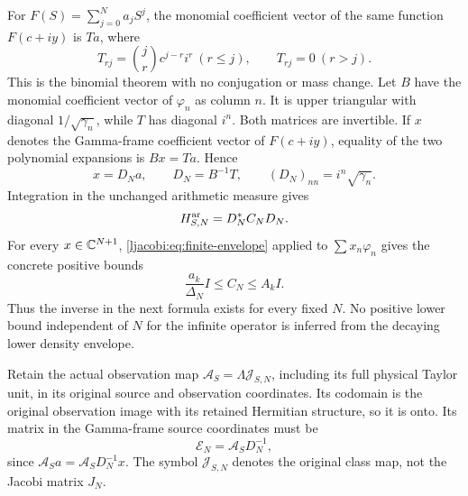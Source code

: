 For $F(S)=\sum_{j=0}^N a_jS^j$, the monomial coefficient vector
of the same function $F(c+iy)$ is $Ta$, where
\[
 T_{rj}=\binom jr c^{j-r}i^r\ (r\leq j),\qquad T_{rj}=0\ (r>j).
\]
This is the binomial theorem with no conjugation or mass change.
Let $B$ have the monomial coefficient vector of $\varphi_n$ as
column $n$. It is upper triangular with diagonal
$1/\sqrt{\gamma_n}$, while $T$ has diagonal $i^n$.
Both matrices are invertible. If $x$ denotes the Gamma-frame
coefficient vector of $F(c+iy)$, equality of the two polynomial
expansions is $Bx=Ta$. Hence
\begin{equation}\label{ljacobi:eq:source}
 x=D_Na,\qquad D_N=B^{-1}T,\qquad
 (D_N)_{nn}=i^n\sqrt{\gamma_n}.
\end{equation}
Integration in the unchanged arithmetic measure gives
\begin{equation}\label{ljacobi:eq:gram}
 H_{S,N}^{\rm ar}=D_N^*C_ND_N.
\end{equation}
For every $x\in\mathbb C^{N+1}$, \eqref{ljacobi:eq:finite-envelope} applied to
$\sum x_n\varphi_n$ gives the concrete positive bounds
\begin{equation}\label{ljacobi:eq:CN-bounds}
 \frac{a_k}{\Delta_N}I\leq C_N\leq A_kI.
\end{equation}
Thus the inverse in the next formula exists for every fixed $N$.
No positive lower bound independent of $N$ for the infinite
operator is inferred from the decaying lower density envelope.

Retain the actual observation map
$\mathcal A_S=\Lambda\mathcal J_{S,N}$, including its full physical
Taylor unit, in its original source and observation coordinates.
Its codomain is the original observation image with its retained
Hermitian structure, so it is onto. Its matrix in the Gamma-frame
source coordinates must be
\begin{equation}\label{ljacobi:eq:E}
 \mathcal E_N=\mathcal A_SD_N^{-1},
\end{equation}
since $\mathcal A_Sa=\mathcal A_SD_N^{-1}x$. The symbol
$\mathcal J_{S,N}$ denotes the original class map, not the Jacobi
matrix $J_N$.

